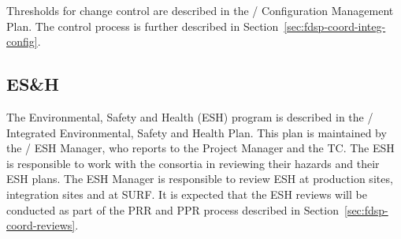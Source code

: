 Thresholds for change control are described in the
/ Configuration Management Plan. The control
process is further described in
Section~\ref{sec:fdsp-coord-integ-config}.

\subsection{ES\&H}
\label{sec:fdsp-coord-esh}

The  Environmental, Safety and Health (ESH) program is
described in the / Integrated Environmental,
Safety and Health Plan. This plan is maintained by the
/ ESH Manager, who reports to the 
Project Manager and the TC. The ESH is responsible to work with the
consortia in reviewing their hazards and their ESH plans.  The ESH
Manager is responsible to review ESH at production sites, integration
sites and at SURF. It is expected that the ESH reviews will be
conducted as part of the PRR and PPR process described in
Section~\ref{sec:fdsp-coord-reviews}.
